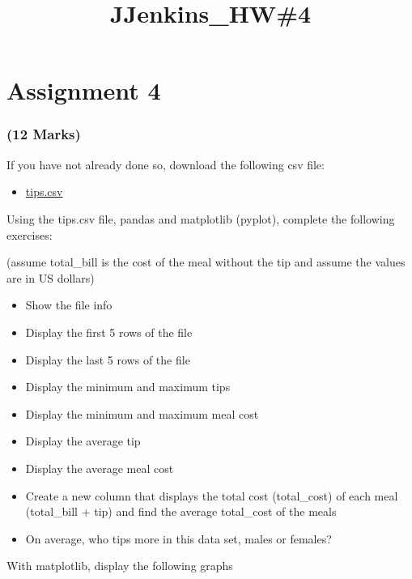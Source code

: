 \documentclass[11pt]{article}
\title{JJenkins\_HW\#4}
\providecommand{\tightlist}{%
      \setlength{\itemsep}{0pt}\setlength{\parskip}{0pt}}
\begin{document}
    
    
    \maketitle
    
    

    
    \hypertarget{assignment-4}{%
\section{Assignment 4}\label{assignment-4}}

\hypertarget{marks}{%
\subsubsection{(12 Marks)}\label{marks}}

If you have not already done so, download the following csv file:

\begin{itemize}
\tightlist
\item
  \href{https://www.dropbox.com/s/br6p2brp54cjpla/tips.csv?dl=1}{tips.csv}
\end{itemize}

Using the tips.csv file, pandas and matplotlib (pyplot), complete the
following exercises:

(assume total\_bill is the cost of the meal without the tip and assume
the values are in US dollars)

\begin{itemize}
\tightlist
\item
  Show the file info
\item
  Display the first 5 rows of the file
\item
  Display the last 5 rows of the file
\item
  Display the minimum and maximum tips
\item
  Display the minimum and maximum meal cost
\item
  Display the average tip
\item
  Display the average meal cost
\item
  Create a new column that displays the total cost (total\_cost) of each
  meal (total\_bill + tip) and find the average total\_cost of the meals
\item
  On average, who tips more in this data set, males or females?
\end{itemize}

With matplotlib, display the following graphs
\end{document}
